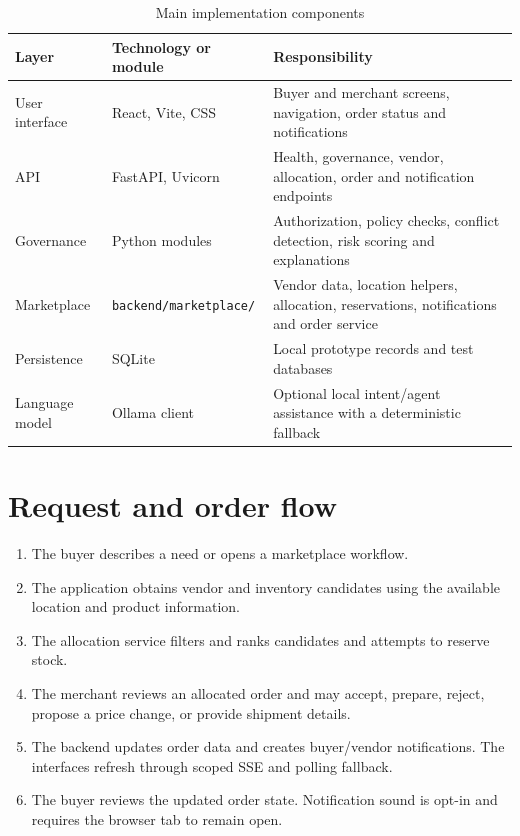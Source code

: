 \documentclass[12pt,a4paper]{report}
\begin{document}
\begin{table}[H]
  \centering
  \caption{Main implementation components}
  \label{tab:components}
  \begin{tabularx}{\textwidth}{p{}YY}
    \toprule
    \textbf{Layer} & \textbf{Technology or module} & \textbf{Responsibility} \\
    \midrule
    User interface & React, Vite, CSS & Buyer and merchant screens,
      navigation, order status and notifications \\
    API & FastAPI, Uvicorn & Health, governance, vendor, allocation,
      order and notification endpoints \\
    Governance & Python modules & Authorization, policy checks, conflict
      detection, risk scoring and explanations \\
    Marketplace & \texttt{backend/marketplace/} & Vendor data, location
      helpers, allocation, reservations, notifications and order service \\
    Persistence & SQLite & Local prototype records and test databases \\
    Language model & Ollama client & Optional local intent/agent assistance
      with a deterministic fallback \\
    \bottomrule
  \end{tabularx}
\end{table}

\section{Request and order flow}
\begin{enumerate}
  \item The buyer describes a need or opens a marketplace workflow.
  \item The application obtains vendor and inventory candidates using the
        available location and product information.
  \item The allocation service filters and ranks candidates and attempts to
        reserve stock.
  \item The merchant reviews an allocated order and may accept, prepare,
        reject, propose a price change, or provide shipment details.
  \item The backend updates order data and creates buyer/vendor notifications.
        The interfaces refresh through scoped SSE and polling fallback.
  \item The buyer reviews the updated order state. Notification sound is
        opt-in and requires the browser tab to remain open.
\end{enumerate}
\end{document}
